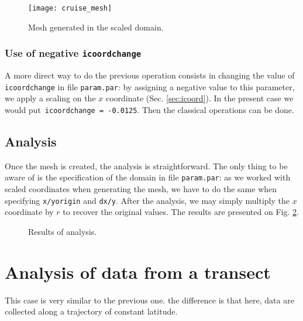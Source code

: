 \begin{figure}[H]
\centering
\texttt{[image: cruise\_mesh]}
\caption{Mesh generated in the scaled domain.\label{fig:mesh}}
\end{figure}

\subsubsection{Use of negative \texttt{icoordchange}}

A more direct way to do the previous operation consists in changing the value of \texttt{icoord\-change} in file \texttt{param.par}: by assigning a negative value to this parameter, we apply a scaling on the $x$ coordinate (Sec. \ref{sec:icoord}). In the present case we would put\, \texttt{icoordchange = -0.0125}. Then the classical \diva operations can be done.



\subsection{Analysis}

Once the mesh is created, the analysis is straightforward. The only thing to be aware of is the specification of the domain in file \texttt{param.par}: as we worked with scaled coordinates when generating the mesh, we have to do the same when specifying \texttt{x/yorigin} and \texttt{dx/y}. After the analysis, we may simply multiply the $x$ coordinate by $r$ to recover the original values. The results are presented on Fig. \ref{fig:analysis}.  

 
\begin{figure}[htpb]
\centering
{}
\caption{Results of analysis.\label{fig:analysis}}
\end{figure}





\section{Analysis of data from a transect}

This case is very similar to the previous one. the difference is that here, data are collected along a trajectory of constant latitude.
